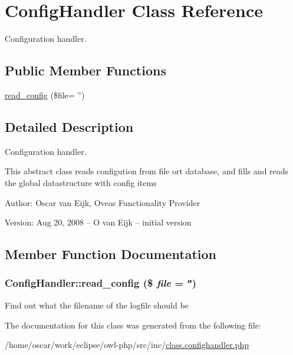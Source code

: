 \hypertarget{classConfigHandler}{
\section{ConfigHandler Class Reference}
\label{classConfigHandler}
}
Configuration handler.  


\subsection*{Public Member Functions}
\begin{CompactItemize}
\item 
\hyperlink{classConfigHandler_75a7f03f156cd0f315f91ec4bbddfbb6}{read\_\-config} (\$file= '')
\end{CompactItemize}


\subsection{Detailed Description}
Configuration handler. 

This abstract class reads configution from file ort database, and fills and reads the global datastructure with config items \begin{Desc}
\item[Author:]Oscar van Eijk, Oveas Functionality Provider \end{Desc}
\begin{Desc}
\item[Version:]Aug 20, 2008 -- O van Eijk -- initial version \end{Desc}


\subsection{Member Function Documentation}
\hypertarget{classConfigHandler_75a7f03f156cd0f315f91ec4bbddfbb6}{
\subsubsection{\setlength{\rightskip}{0pt plus 5cm}ConfigHandler::read\_\-config (\$ {\em file} = {\tt ''})}}
\label{classConfigHandler_75a7f03f156cd0f315f91ec4bbddfbb6}


Find out what the filename of the logfile should be 

The documentation for this class was generated from the following file:\begin{CompactItemize}
\item 
/home/oscar/work/eclipse/owl-php/src/inc/\hyperlink{class_8confighandler_8php}{class.confighandler.php}\end{CompactItemize}
